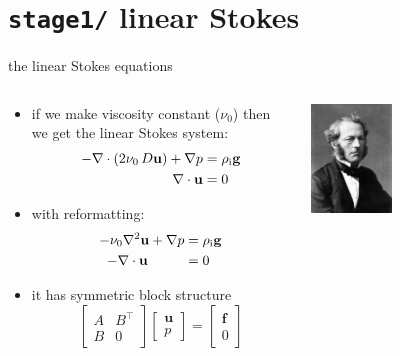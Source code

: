 \documentclass[10pt,hyperref,dvipsnames]{beamer}
\newcommand{\bbf}{\mathbf{f}}
\newcommand{\bu}{\mathbf{u}}
\newcommand{\Div}{\nabla\cdot}
\begin{document}
\section{\texttt{stage1/} \qquad linear Stokes}

\begin{frame}{the linear Stokes equations}

\begin{columns}

\begin{column}{0.6\textwidth}
\begin{itemize}
\item if we make viscosity constant ($\nu_0$) then we get the linear Stokes system:
\begin{align*}
- \nabla \cdot \left(2 \nu_0\, D\bu\right) + \nabla p &= \rhoi \mathbf{g}  \\
\Div \bu &= 0
\end{align*}
\item with reformatting:
\begin{align*}
- \nu_0 \nabla^2 \bu + \nabla p &= \rhoi \mathbf{g}  \\
-\Div \bu \qquad \,\,\,\, &= 0
\end{align*}
\item it has symmetric block structure
  $$\begin{bmatrix} A & B^\top \\ B & 0 \end{bmatrix} \begin{bmatrix} \bu \\ p  \end{bmatrix} = \begin{bmatrix} \bbf \\ 0 \end{bmatrix}$$
\end{itemize}
\end{column}

\begin{column}{0.4\textwidth}
\hfill \includegraphics[width=0.4\textwidth]{figs/people/gstokes.jpg}


\end{column}
\end{columns}
\end{frame}
\end{document}
